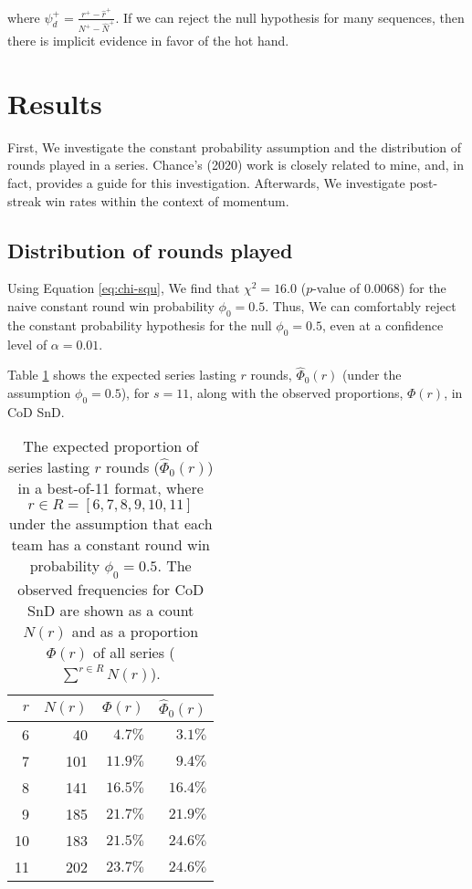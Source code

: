 \documentclass{article}
\begin{document}
where \(\psi^+_d = \frac{r^+ - \hat{r}^+}{N^+ - \hat{N}^+}\). If we can
reject the null hypothesis for many sequences, then there is implicit
evidence in favor of the hot hand.

\hypertarget{results}{%
\section{Results}\label{results}}

First, We investigate the constant probability assumption and the
distribution of rounds played in a series. Chance's (2020) work is
closely related to mine, and, in fact, provides a guide for this
investigation. Afterwards, We investigate post-streak win rates within
the context of momentum.

\hypertarget{distribution-of-rounds-played-1}{%
\subsection{Distribution of rounds
played}\label{distribution-of-rounds-played-1}}

Using Equation \ref{eq:chi-squ}, We find that \(\chi^2 = 16.0\)
(\(p\)-value of 0.0068) for the naive constant round win probability
\(\phi_0 = 0.5\). Thus, We can comfortably reject the constant
probability hypothesis for the null \(\phi_0 = 0.5\), even at a
confidence level of \(\alpha = 0.01\).

Table \ref{tbl:cod-prob-series-lasting-r-rounds} shows the expected
series lasting \(r\) rounds, \(\hat{\Phi}_0(r)\) (under the assumption
\(\phi_0 = 0.5\)), for \(s = 11\), along with the observed proportions,
\(\Phi(r)\), in CoD SnD.

\begin{longtable}{rrrr}
\caption{The expected proportion of series lasting $r$ rounds ($\hat{\Phi}_0(r)$) in a best-of-11 format, where $r \in R = [6, 7, 8, 9, 10, 11]$ under the assumption that each team has a constant round win probability $\phi_0 = 0.5$. The observed frequencies for CoD SnD are shown as a count $N(r)$ and as a proportion $\Phi(r)$ of all series ($\sum^{r \in R} N(r)$).}\label{tbl:cod-prob-series-lasting-r-rounds} \\
\toprule
$r$ & $N(r)$ & $\Phi(r)$ & $\hat{\Phi}_0(r)$ \\ 
\midrule
6 & 40 & $4.7\%$ & $3.1\%$ \\ 
7 & 101 & $11.9\%$ & $9.4\%$ \\ 
8 & 141 & $16.5\%$ & $16.4\%$ \\ 
9 & 185 & $21.7\%$ & $21.9\%$ \\ 
10 & 183 & $21.5\%$ & $24.6\%$ \\ 
11 & 202 & $23.7\%$ & $24.6\%$ \\ 
\bottomrule
\end{longtable}
\end{document}
